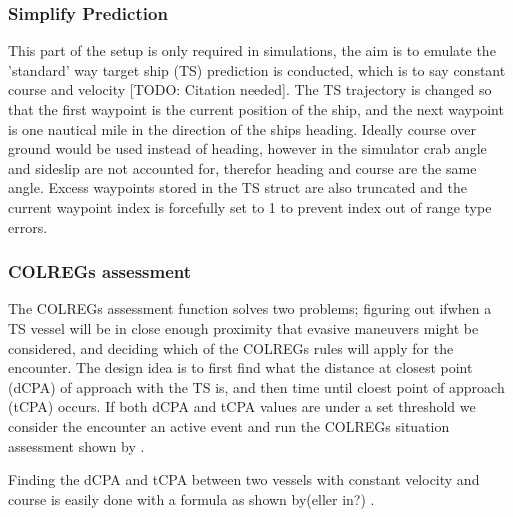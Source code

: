 \subsubsection{Simplify Prediction}
This part of the setup is only required in simulations, the aim is to emulate the 'standard' way target ship (TS) prediction is conducted,
which is to say constant course and velocity [TODO: Citation needed]. The TS trajectory is changed so that the first waypoint is the current position of the
ship, and the next waypoint is one nautical mile in the direction of the ships heading. Ideally course over ground would be used instead of heading, however
in the simulator crab angle and sideslip are not accounted for, therefor heading and course are the same angle.
Excess waypoints stored in the TS struct are also truncated and the current waypoint index is forcefully set to 1 to prevent index out of range type errors.


\subsubsection{COLREGs assessment}
The COLREGs assessment function solves two problems; figuring out if\/when a TS vessel will be in close enough proximity that evasive maneuvers might be considered,
and deciding which of the COLREGs rules will apply for the encounter. The design idea is to first find what the distance at closest point (dCPA) of approach with the TS is, and then
time until cloest point of approach (tCPA) occurs. If both dCPA and tCPA values are under a set threshold we consider the encounter an active event and run the
COLREGs situation assessment shown by \cite{Thyri2021b}. %

Finding the dCPA and tCPA between two vessels with constant velocity and course is easily done with a formula as shown by(eller in?) \cite{Kufoalor2018}.




